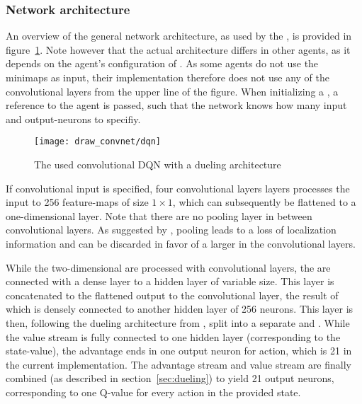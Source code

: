 \subsubsection{Network architecture}

An overview of the general network architecture, as used by the , is provided in figure~\ref{fig:dqn_graph}. Note however that the actual architecture differs in other agents, as it depends on the agent's configuration of . As some agents do not use the minimaps as input, their implementation therefore does not use any of the convolutional layers from the upper line of the figure. When initializing a , a reference to the agent is passed, such that the network knows how many input and output-neurons to specifiy.

\begin{figure}[h]
	\centering 
	\texttt{[image: draw\_convnet/dqn]}
	\caption{The used convolutional DQN with a dueling architecture}
	\label{fig:dqn_graph}
\end{figure}

If convolutional input is specified, four convolutional layers layers processes the input to 256 feature-maps of size $1 \times 1$, which can subsequently be flattened to a one-dimensional layer. Note that there are no pooling layer in between convolutional layers. As suggested by \cite{springenberg_striving_2014}, pooling leads to a loss of localization information and can be discarded in favor of a larger  in the convolutional layers.

While the two-dimensional  are processed with convolutional layers, the  are connected with a dense layer to a hidden layer of variable size. This layer is concatenated to the flattened output to the convolutional layer, the result of which is densely connected to another hidden layer of 256 neurons. This layer is then, following the dueling architecture from \cite{wang_dueling_2015}, split into a separate  and . While the value stream is fully connected to one hidden layer (corresponding to the state-value), the advantage ends in one output neuron for action, which is 21 in the current implementation. The advantage stream and value stream are finally combined (as described in section~\ref{sec:dueling}) to yield 21 output neurons, corresponding to one Q-value for every action in the provided state.

